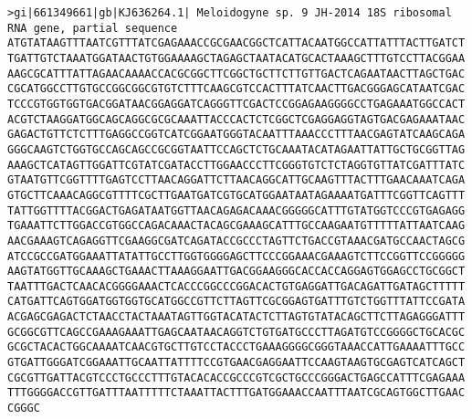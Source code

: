 \documentclass[11pt]{article}
\begin{document}
\begin{Verbatim}[commandchars=\\\{\}]
>gi|661349661|gb|KJ636264.1| Meloidogyne sp. 9 JH-2014 18S ribosomal RNA gene, partial sequence
ATGTATAAGTTTAATCGTTTATCGAGAAACCGCGAACGGCTCATTACAATGGCCATTATTTACTTGATCT
TGATTGTCTAAATGGATAACTGTGGAAAAGCTAGAGCTAATACATGCACTAAAGCTTTGTCCTTACGGAA
AAGCGCATTTATTAGAACAAAACCACGCGGCTTCGGCTGCTTCTTGTTGACTCAGAATAACTTAGCTGAC
CGCATGGCCTTGTGCCGGCGGCGTGTCTTTCAAGCGTCCACTTTATCAACTTGACGGGAGCATAATCGAC
TCCCGTGGTGGTGACGGATAACGGAGGATCAGGGTTCGACTCCGGAGAAGGGGCCTGAGAAATGGCCACT
ACGTCTAAGGATGGCAGCAGGCGCGCAAATTACCCACTCTCGGCTCGAGGAGGTAGTGACGAGAAATAAC
GAGACTGTTCTCTTTGAGGCCGGTCATCGGAATGGGTACAATTTAAACCCTTTAACGAGTATCAAGCAGA
GGGCAAGTCTGGTGCCAGCAGCCGCGGTAATTCCAGCTCTGCAAATACATAGAATTATTGCTGCGGTTAG
AAAGCTCATAGTTGGATTCGTATCGATACCTTGGAACCCTTCGGGTGTCTCTAGGTGTTATCGATTTATC
GTAATGTTCGGTTTTGAGTCCTTAACAGGATTCTTAACAGGCATTGCAAGTTTACTTTGAACAAATCAGA
GTGCTTCAAACAGGCGTTTTCGCTTGAATGATCGTGCATGGAATAATAGAAAATGATTTCGGTTCAGTTT
TATTGGTTTTACGGACTGAGATAATGGTTAACAGAGACAAACGGGGGCATTTGTATGGTCCCGTGAGAGG
TGAAATTCTTGGACCGTGGCCAGACAAACTACAGCGAAAGCATTTGCCAAGAATGTTTTTATTAATCAAG
AACGAAAGTCAGAGGTTCGAAGGCGATCAGATACCGCCCTAGTTCTGACCGTAAACGATGCCAACTAGCG
ATCCGCCGATGGAAATTATATTGCCTTGGTGGGGAGCTTCCCGGAAACGAAAGTCTTCCGGTTCCGGGGG
AAGTATGGTTGCAAAGCTGAAACTTAAAGGAATTGACGGAAGGGCACCACCAGGAGTGGAGCCTGCGGCT
TAATTTGACTCAACACGGGGAAACTCACCCGGCCCGGACACTGTGAGGATTGACAGATTGATAGCTTTTT
CATGATTCAGTGGATGGTGGTGCATGGCCGTTCTTAGTTCGCGGAGTGATTTGTCTGGTTTATTCCGATA
ACGAGCGAGACTCTAACCTACTAAATAGTTGGTACATACTCTTAGTGTATACAGCTTCTTAGAGGGATTT
GCGGCGTTCAGCCGAAAGAAATTGAGCAATAACAGGTCTGTGATGCCCTTAGATGTCCGGGGCTGCACGC
GCGCTACACTGGCAAAATCAACGTGCTTGTCCTACCCTGAAAGGGGCGGGTAAACCATTGAAAATTTGCC
GTGATTGGGATCGGAAATTGCAATTATTTTCCGTGAACGAGGAATTCCAAGTAAGTGCGAGTCATCAGCT
CGCGTTGATTACGTCCCTGCCCTTTGTACACACCGCCCGTCGCTGCCCGGGACTGAGCCATTTCGAGAAA
TTTGGGGACCGTTGATTTAATTTTTCTAAATTACTTTGATGGAAACCAATTTAATCGCAGTGGCTTGAAC
CGGGC


\end{Verbatim}
\end{document}
